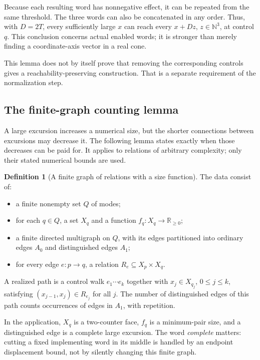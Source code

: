 \documentclass[11pt,a4paper]{article}
\theoremstyle{definition}
\newtheorem{definition}[theorem]{Definition}
\theoremstyle{remark}
\newcommand{\N}{\mathbb N}
\begin{document}
Because each resulting word has nonnegative effect, it can be
repeated from the same threshold. The three words can also be
concatenated in any order. Thus, with \(D=2T\), every sufficiently
large \(x\) can reach every \(x+D z\), \(z\in\N^3\), at control \(q\).
This conclusion concerns actual enabled words; it is stronger than
merely finding a coordinate-axis vector in a real cone.

This lemma does not by itself prove that removing the corresponding
controls gives a reachability-preserving construction. That is a
separate requirement of the normalization step.

\subsection{The finite-graph counting lemma}

A large excursion increases a numerical size, but the shorter
connections between excursions may decrease it. The following lemma
states exactly when those decreases can be paid for. It applies to
relations of arbitrary complexity; only their stated numerical bounds
are used.

\begin{definition}[A finite graph of relations with a size function]
\label{def:relation-size-graph}
The data consist of:
\begin{itemize}
\item a finite nonempty set \(Q\) of modes;
\item for each \(q\in Q\), a set \(X_q\) and a function
      \(f_q:X_q\to\mathbb R_{\ge0}\);
\item a finite directed multigraph on \(Q\), with its edges partitioned
      into ordinary edges \(A_0\) and distinguished edges \(A_1\);
\item for every edge \(e:p\to q\), a relation
      \(R_e\subseteq X_p\times X_q\).
\end{itemize}
A realized path is a control walk \(e_1\cdots e_k\) together with
\(x_j\in X_{q_j}\), \(0\le j\le k\), satisfying
\((x_{j-1},x_j)\in R_{e_j}\) for all \(j\).
The number of distinguished edges of this path counts occurrences
of edges in \(A_1\), with repetition.
\end{definition}

In the application, \(X_q\) is a two-counter face, \(f_q\) is a
minimum-pair size, and a distinguished edge is a complete large
excursion. The word \emph{complete} matters: cutting a fixed implementing
word in its middle is handled by an endpoint displacement bound,
not by silently changing this finite graph.
\end{document}
